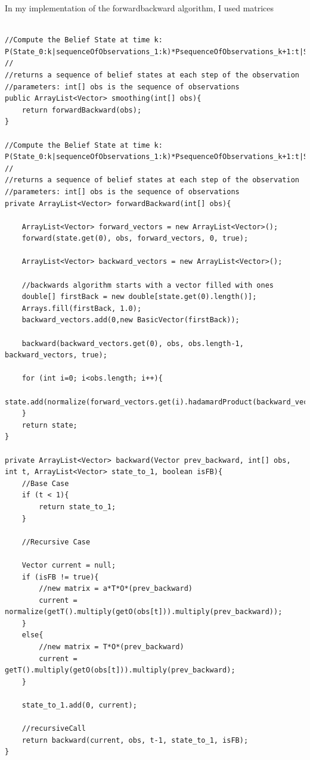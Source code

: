 \documentclass[a4paper]{article}
\begin{document}
In my implementation of the forwardbackward algorithm, I used matrices


\lstset{
numbers=left
}
\begin{lstlisting}

//Compute the Belief State at time k: P(State_0:k|sequenceOfObservations_1:k)*PsequenceOfObservations_k+1:t|State_k+1:t)
//
//returns a sequence of belief states at each step of the observation
//parameters: int[] obs is the sequence of observations
public ArrayList<Vector> smoothing(int[] obs){
	return forwardBackward(obs);
}

//Compute the Belief State at time k: P(State_0:k|sequenceOfObservations_1:k)*PsequenceOfObservations_k+1:t|State_k+1:t)
//
//returns a sequence of belief states at each step of the observation
//parameters: int[] obs is the sequence of observations
private ArrayList<Vector> forwardBackward(int[] obs){
	
	ArrayList<Vector> forward_vectors = new ArrayList<Vector>();
	forward(state.get(0), obs, forward_vectors, 0, true);
	
	ArrayList<Vector> backward_vectors = new ArrayList<Vector>();
	
	//backwards algorithm starts with a vector filled with ones
	double[] firstBack = new double[state.get(0).length()];
	Arrays.fill(firstBack, 1.0);
	backward_vectors.add(0,new BasicVector(firstBack));
	
	backward(backward_vectors.get(0), obs, obs.length-1, backward_vectors, true);
	
	for (int i=0; i<obs.length; i++){
		state.add(normalize(forward_vectors.get(i).hadamardProduct(backward_vectors.get(i))));
	}
	return state;
}

private ArrayList<Vector> backward(Vector prev_backward, int[] obs, int t, ArrayList<Vector> state_to_1, boolean isFB){
	//Base Case
	if (t < 1){
		return state_to_1;
	}

	//Recursive Case
	
	Vector current = null;
	if (isFB != true){
		//new matrix = a*T*O*(prev_backward)
		current = normalize(getT().multiply(getO(obs[t])).multiply(prev_backward));
	}
	else{
		//new matrix = T*O*(prev_backward)
		current = getT().multiply(getO(obs[t])).multiply(prev_backward);
	}
	
	state_to_1.add(0, current);
	
	//recursiveCall
	return backward(current, obs, t-1, state_to_1, isFB);
}
\end{lstlisting}
\end{document}
